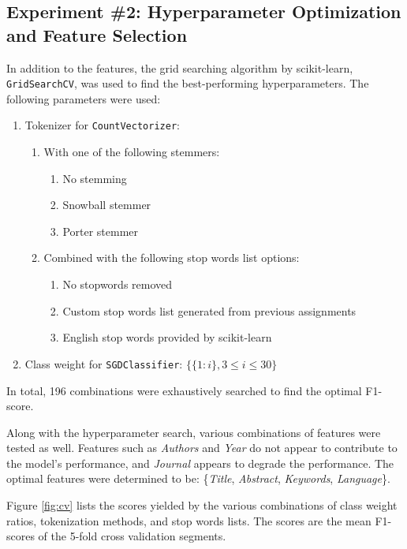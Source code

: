 \documentclass[11pt]{article}
\begin{document}
\subsection{Experiment \#2: Hyperparameter Optimization and Feature Selection}
In addition to the features, the grid searching algorithm by scikit-learn, \texttt{GridSearchCV}, was used to find the best-performing hyperparameters. The following parameters were used:
\begin{enumerate}
    \item Tokenizer for \texttt{CountVectorizer}:
    \begin{enumerate}
        \item With one of the following stemmers:
        \begin{enumerate}
            \item No stemming
            \item Snowball stemmer
            \item Porter stemmer
        \end{enumerate}
        \item Combined with the following stop words list options:
        \begin{enumerate}
            \item No stopwords removed
            \item Custom stop words list generated from previous assignments
            \item English stop words provided by scikit-learn
        \end{enumerate}
    \end{enumerate}
    \item Class weight for \texttt{SGDClassifier}: $\{\{1: i\}, 3 \le i \le 30\}$
\end{enumerate}
In total, 196 combinations were exhaustively searched to find the optimal F1-score.

Along with the hyperparameter search, various combinations of features were tested as well. Features such as \textit{Authors} and \textit{Year} do not appear to contribute to the model's performance, and \textit{Journal} appears to degrade the performance. The optimal features were determined to be: \{\textit{Title}, \textit{Abstract}, \textit{Keywords}, \textit{Language}\}.

Figure \ref{fig:cv} lists the scores yielded by the various combinations of class weight ratios, tokenization methods, and stop words lists. The scores are the mean F1-scores of the 5-fold cross validation segments.
\end{document}
